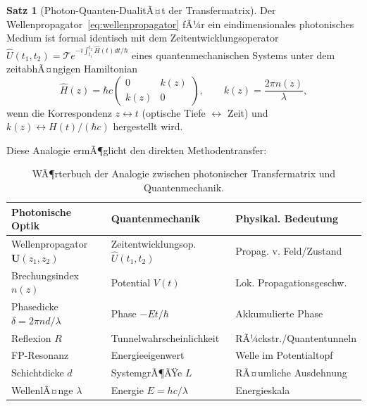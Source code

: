 ﻿\documentclass[a4paper,12pt]{article}
\theoremstyle{definition}
\newtheorem{satz}{Satz}[section]
\newcommand{\matr}[1]{\mathbf{#1}}
\begin{document}
	\begin{satz}[Photon-Quanten-DualitÃ¤t der Transfermatrix]
		\label{satz:qm-analogie}
		Der Wellenpropagator~\eqref{eq:wellenpropagator} fÃ¼r ein eindimensionales
		photonisches Medium ist formal identisch mit dem Zeitentwicklungsoperator
		$\hat{U}(t_1, t_2) = \mathcal{T}e^{-i\int_{t_1}^{t_2} \hat{H}(t) dt/\hbar}$
		eines quantenmechanischen Systems unter dem zeitabhÃ¤ngigen Hamiltonian
		\begin{equation}
			\hat{H}(z) = \hbar c \begin{pmatrix} 0 & k(z) \\ k(z) & 0 \end{pmatrix},
			\qquad k(z) = \frac{2\pi n(z)}{\lambda},
			\label{eq:effektiver-hamiltonian}
		\end{equation}
		wenn die Korrespondenz $z \leftrightarrow t$ (optische Tiefe $\leftrightarrow$ Zeit)
		und $k(z) \leftrightarrow H(t)/(\hbar c)$ hergestellt wird.
	\end{satz}
	
	Diese Analogie ermÃ¶glicht den direkten Methodentransfer:
	
	\begin{table}[htb]
		\centering
		\caption{WÃ¶rterbuch der Analogie zwischen photonischer Transfermatrix
			und Quantenmechanik.}
		\label{tab:analogie}
		\begin{tabular}{lll}
			\toprule
			\textbf{Photonische Optik} & \textbf{Quantenmechanik} & \textbf{Physikal. Bedeutung}\\
			\midrule
			Wellenpropagator $\matr{U}(z_1,z_2)$ & Zeitentwicklungsop. $\hat{U}(t_1,t_2)$
			& Propag. v. Feld/Zustand\\
			Brechungsindex $n(z)$ & Potential $V(t)$ & Lok. Propagationsgeschw.\\
			Phasedicke $\delta = 2\pi nd/\lambda$ & Phase $-Et/\hbar$ & Akkumulierte Phase\\
			Reflexion $R$ & Tunnelwahrscheinlichkeit & RÃ¼ckstr./Quantentunneln\\
			FP-Resonanz & Energieeigenwert & Welle im Potentialtopf\\
			Schichtdicke $d$ & SystemgrÃ¶ÃŸe $L$ & RÃ¤umliche Ausdehnung\\
			WellenlÃ¤nge $\lambda$ & Energie $E = hc/\lambda$ & Energieskala\\
			\bottomrule
		\end{tabular}
	\end{table}
	
\end{document}
